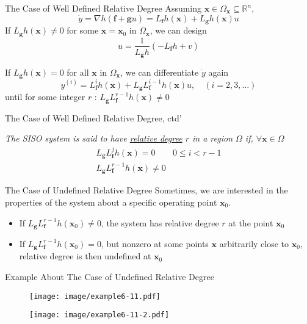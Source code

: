 \documentclass{beamer}
\renewcommand{\vec}[1]{\ensuremath{\boldsymbol{#1}}} %
\begin{document}
\begin{frame}{The Case of Well Defined Relative Degree}
    Assuming $\vec{x} \in \Omega_{\vec{x}} \subseteq \mathbb{R}^{n} $,
    $$
    \dot{y}=\nabla h(\vec{f}+\vec{g} u)=L_{\vec{f}} h(\vec{x})+L_{\vec{g}} h(\vec{x}) u
    $$
    {\color{red}If $L_{\vec{g}}h(\vec{x}) \ne 0$ for some $\vec{x}=\vec{x}_{0}$ in $\Omega_{\vec{x}}$}, we can design
    $$u=\frac{1}{L_{\vec{g}} h}\left(-L_{\vec{f}} h+v\right)$$

    {\color{red}If $L_{\vec{g}}h(\vec{x}) = 0$ for all \vec{x} in $\Omega_{\vec{x}}$}, we can differentiate $\dot{y}$ again
    $$
    y^{(i)}=L_{\vec{f}}^{i} h(\vec{x})+L_{\vec{g}} L_{\vec{f}}^{i-1} h(\vec{x}) u, \quad (i=2,3, \dots)
    $$
    until for some integer $r$ : $L_{\vec{g}} L_{\vec{f}}^{r-1} h(\vec{x}) \neq 0$
\end{frame}

\begin{frame}{The Case of Well Defined Relative Degree, ctd'}
    \begin{definition}[6.7]
    \textit{
    The SISO system is said to have \underline{relative degree} $r$ in a region $\Omega$ if, $\forall \vec{x} \in \Omega$
    $$
    \begin{array}{ll}{L_{\vec{g}} L_{\vec{f}}^{j} h(\vec{x})=0} & {0 \leq i<r-1} \\ {L_{\vec{g}} L_{\vec{f}}^{r-1} h(\vec{x}) \neq 0}\end{array}
    $$
    }
    \end{definition}
\end{frame}


\begin{frame}{The Case of Undefined Relative Degree}
    Sometimes, we are interested in the properties of the system about a {\color{red}specific operating point $\vec{x}_{0}$}.

    \begin{itemize}
      \item If $L_{\vec{g}} L_{\vec{f}}^{r-1} h(\vec{x}_{0}) \neq 0$, the system has relative degree $r$ {\color{red}at the point $\vec{x}_{0}$}
      \item If $L_{\vec{g}} L_{\vec{f}}^{r-1} h(\vec{x}_{0}) = 0$, but nonzero at some points \vec{x} arbitrarily close to $\vec{x}_{0}$, relative degree is then {\color{red} undefined} at $\vec{x}_{0}$
    \end{itemize}
\end{frame}

\begin{frame}{Example About The Case of Undefined Relative Degree}
    \begin{figure}
      \centering
      \texttt{[image: image/example6-11.pdf]}
    \end{figure}
    \vspace{-20pt}
    \begin{figure}
      \centering
      \texttt{[image: image/example6-11-2.pdf]}
    \end{figure}
\end{frame}
\end{document}
